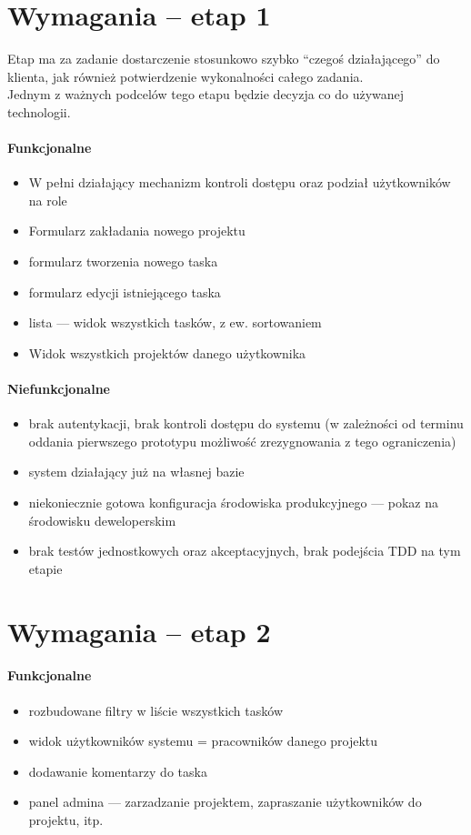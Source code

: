 \documentclass[a4paper,12pt,notitlepage]{mwrep}
\begin{document}
\section{Wymagania -- etap 1}
Etap ma za zadanie dostarczenie stosunkowo szybko “czegoś działającego” do klienta,
jak również potwierdzenie wykonalności całego zadania.\\
Jednym z ważnych podcelów tego etapu będzie decyzja co do używanej technologii.
\paragraph{Funkcjonalne}
\begin{itemize}
	\item	W pełni działający mechanizm kontroli dostępu oraz podział użytkowników na role
	\item	Formularz zakładania nowego projektu
	\item	formularz tworzenia nowego taska
	\item	formularz edycji istniejącego taska
	\item	lista --- widok wszystkich tasków, z ew. sortowaniem
	\item	Widok wszystkich projektów danego użytkownika
\end{itemize}
\paragraph{Niefunkcjonalne}
\begin{itemize}
	\item	brak autentykacji, brak kontroli dostępu do systemu (w zależności od terminu
			oddania pierwszego prototypu możliwość zrezygnowania z tego ograniczenia)
	\item	system działający już na własnej bazie
	\item	niekoniecznie gotowa konfiguracja środowiska produkcyjnego --- pokaz na środowisku deweloperskim
	\item	brak testów jednostkowych oraz akceptacyjnych, brak podejścia TDD na tym etapie
\end{itemize}




\section{Wymagania -- etap 2}
\paragraph{Funkcjonalne}
\begin{itemize}
	\item	rozbudowane filtry w liście wszystkich tasków
	\item	widok użytkowników systemu = pracowników danego projektu
	\item	dodawanie komentarzy do taska
	\item	panel admina --- zarzadzanie projektem, zapraszanie użytkowników do projektu, itp.
\end{itemize}
\end{document}
